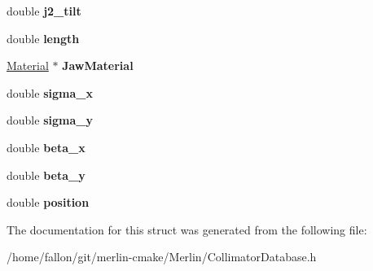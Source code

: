 \begin{DoxyCompactItemize}
double {\bfseries j2\+\_\+tilt}
\item 
\mbox{\label{structCollimatorDatabase_1_1CollimatorData_a7441d0943e80f9bcbdd6f8458aa48a69}} 
double {\bfseries length}
\item 
\mbox{\label{structCollimatorDatabase_1_1CollimatorData_acdf1a13ef311bae190b2c5ed0250bc21}} 
\hyperlink{classMaterial}{Material} $\ast$ {\bfseries Jaw\+Material}
\item 
\mbox{\label{structCollimatorDatabase_1_1CollimatorData_a93cb9999ca10e8468a5de64245ca2261}} 
double {\bfseries sigma\+\_\+x}
\item 
\mbox{\label{structCollimatorDatabase_1_1CollimatorData_a8820fb77370721e18a13b3d0f4d9a5d9}} 
double {\bfseries sigma\+\_\+y}
\item 
\mbox{\label{structCollimatorDatabase_1_1CollimatorData_a4073c006110a6071fb00811b2c540c1a}} 
double {\bfseries beta\+\_\+x}
\item 
\mbox{\label{structCollimatorDatabase_1_1CollimatorData_a7fa27fa0751dd0208a1464cdb99c1cf5}} 
double {\bfseries beta\+\_\+y}
\item 
\mbox{\label{structCollimatorDatabase_1_1CollimatorData_a1e8877202df1772d054480e0e65a75c4}} 
double {\bfseries position}
\end{DoxyCompactItemize}


The documentation for this struct was generated from the following file\+:\begin{DoxyCompactItemize}
\item 
/home/fallon/git/merlin-\/cmake/\+Merlin/Collimator\+Database.\+h\end{DoxyCompactItemize}
